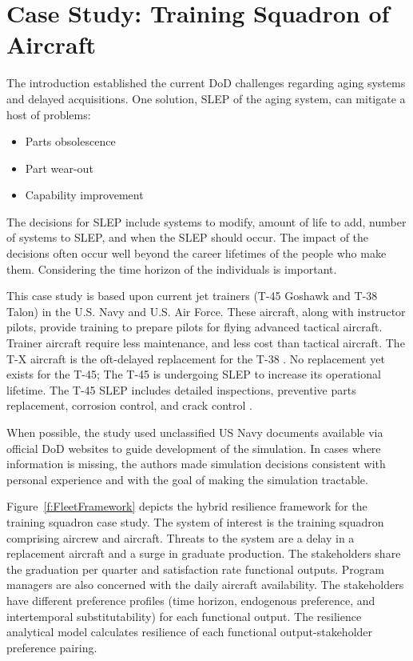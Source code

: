 \documentclass[preprint,12pt]{elsarticle}
\begin{document}
\section{Case Study: Training Squadron of Aircraft}
\label{s:CaseStudy}
The introduction established the current DoD challenges regarding
aging systems and delayed acquisitions\cite{Burgess2015,LaGrone2016,awstf35}. One solution, SLEP of the
aging system, can mitigate a host of problems: 
\begin{itemize}
\item Parts obsolescence \cite{Tomczykowski2001}
\item Part wear-out \cite{jennings2018}
\item Capability improvement \cite{Burgess2015}
\end{itemize}

The decisions for SLEP include systems to modify, amount of life to add, number of
systems to SLEP, and when the SLEP should occur. The impact of the
decisions often occur well beyond the career lifetimes of the people
who make them. Considering the time horizon of the individuals is important.

This case study is based upon current jet trainers (T-45 Goshawk and
T-38 Talon) in the U.S. Navy and U.S. Air Force. These aircraft, along
with instructor pilots, provide training to prepare pilots for flying advanced tactical
aircraft. Trainer aircraft require less maintenance, and less cost
than tactical aircraft. The T-X aircraft is the
oft-delayed replacement for the T-38 \cite{Mehta2013}. No replacement
yet exists for the T-45; The T-45 is undergoing SLEP to increase its operational
lifetime. The T-45 SLEP includes detailed inspections, preventive parts 
replacement, corrosion control, and crack control \cite{jennings2018}.

When possible, the study used unclassified US Navy documents
available via official DoD websites to guide development of the
simulation. In cases where information is missing, the authors made
simulation decisions consistent with personal experience and with the
goal of making the simulation tractable.

Figure~\ref{f:FleetFramework} depicts the hybrid resilience framework
for the training squadron case study. The system of interest is the
training squadron comprising aircrew and aircraft. Threats to the
system are a delay in a replacement aircraft and a surge in graduate
production. The stakeholders share the graduation per quarter and
satisfaction rate functional outputs. Program managers are also
concerned with the daily aircraft availability. The stakeholders have
different preference profiles (time horizon, endogenous preference,
and intertemporal substitutability) for each functional output. The
resilience analytical model calculates resilience of each functional
output-stakeholder preference pairing.
\end{document}
